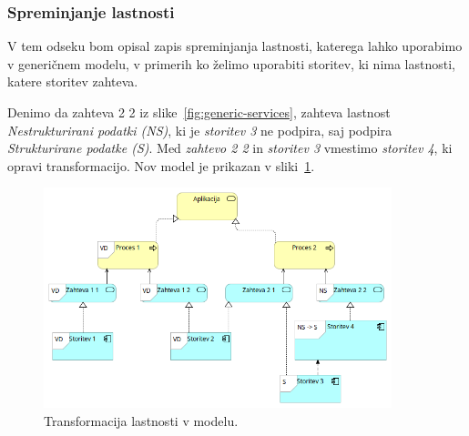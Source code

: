 \subsubsection{Spreminjanje lastnosti}

V tem odseku bom opisal zapis spreminjanja lastnosti,
katerega lahko uporabimo v generičnem modelu, v primerih
ko želimo uporabiti storitev, ki nima lastnosti,
katere storitev zahteva.

Denimo da zahteva 2 2 iz slike~\ref{fig:generic-services},
zahteva lastnost \textit{Nestrukturirani podatki (NS)},
ki je \textit{storitev 3} ne podpira,
saj podpira \textit{Strukturirane podatke (S)}.
Med \textit{zahtevo 2 2} in \textit{storitev 3}
vmestimo \textit{storitev 4},
ki opravi transformacijo.
Nov model je prikazan v sliki~\ref{fig:transform}.

\begin{figure}[H]
    \centering
    \includegraphics[width=0.9\textwidth]{img/gradnja/generic-transformation.png}
    \caption{Transformacija lastnosti v modelu.}
    \label{fig:transform}
\end{figure}
